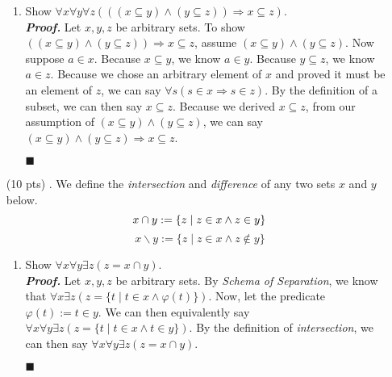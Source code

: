\documentclass[11pt,a4paper]{article}
\begin{document}
\begin{enumerate}
\begin{enumerate}
        \item 
        Show $\forall x \forall y \forall z (((x \subseteq y) \land (y \subseteq z)) \Rightarrow x \subseteq z)$. \\
        \emph{\textbf{Proof.}} Let $x, y, z$ be arbitrary sets. To show $((x \subseteq y) \land (y \subseteq z)) \Rightarrow x \subseteq z$, assume $(x \subseteq y) \land (y \subseteq z)$. 
        Now suppose $a \in x$. Because $x \subseteq y$, we know $a \in y$. Because $y \subseteq z$, we know $a \in z$. 
        Because we chose an arbitrary element of $x$ and proved it must be an element of $z$, we can say $\forall s (s \in x \Rightarrow s \in z)$.
        By the definition of a subset, we can then say $x \subseteq z$. Because we derived $x \subseteq z$, from our assumption of $(x \subseteq y) \land (y \subseteq z)$, we can say $(x \subseteq y) \land (y \subseteq z) \Rightarrow x \subseteq z$.  
        \begin{flushright}
            $\blacksquare$
        \end{flushright}
    \end{enumerate}

    \item[(10 pts) \quad 2.]
    We define the \emph{intersection} and \emph{difference} of any two sets $x$ and $y$ below.
    \begin{equation*}
     x \cap y := \{ z \mid z \in x \land z \in y\} \\ 
    \end{equation*}
    \begin{equation*}
        x \backslash y := \{ z \mid z \in x \land z \notin y\} 
    \end{equation*}
    \begin{enumerate}

        \item 
        Show $\forall x \forall y \exists z (z = x \cap y)$. \\
        \emph{\textbf{Proof.}} Let $x, y, z$ be arbitrary sets. By \emph{Schema of Separation}, we know that $\forall x \exists z (z = \{t \mid t \in x \land \varphi (t)\})$.
        Now, let the predicate $\varphi (t) := t \in y$. We can then equivalently say $\forall x \forall y \exists z (z = \{t \mid t \in x \land t \in y\}). $
        By the definition of \emph{intersection}, we can then say $\forall x \forall y \exists z (z = x \cap y)$.
        \begin{flushright}
            $\blacksquare$
        \end{flushright}


\end{enumerate}
\end{enumerate}
\end{document}
